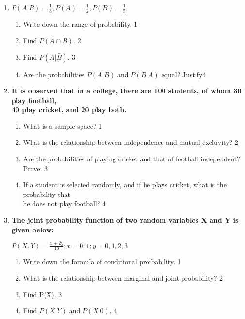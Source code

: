 \documentclass{article}
\begin{document}
\begin{enumerate}

  \item
  \textbf{$P(A\vert B) = \frac 1 8, P(A) = \frac 12, P(B) = \frac 15$}
 
  \begin{enumerate}
    \item
	Write down the range of probability. \hfill 1
    \item
    	Find $P(A\cap B)$.  \hfill 2
    \item
    	Find $P(A\vert \bar B)$. \hfill 3
     \item
     	Are the probabilities $P(A\vert B)$ and $P(B\vert A)$ equal? Justify\hfill 4
  \end{enumerate}
  
  \item
  \textbf{It is observed that in a college, there are 100 students, of whom 30 play football, \\ 40 play cricket, and 20 play both.}
 
  \begin{enumerate}
    \item
	What is a sample space? \hfill 1
    \item
    	What is the relationship between independence and mutual excluvity?  \hfill 2
    \item
    	Are the probabilities of playing cricket and that of football independent? Prove. \hfill 3
     \item
     	If a student is selected randomly, and if he plays cricket, what is the probability that \\ he does not play football? \hfill 4
  \end{enumerate}
  
    \item
  \textbf{The joint probability function of two random variables X and Y is given below:}
  
  $\displaystyle P(X,Y) = \frac {x+2y}{16}; x = 0, 1; y = 0 ,1,2,3$
 
  \begin{enumerate}
    \item
	Write down the formula of conditional proibability. \hfill 1
    \item
    	What is the relationship between marginal and joint probability? \hfill 2
    \item
    	Find P(X). \hfill 3
     \item
     	Find $P(X\vert Y)$ and $P(X\vert 0)$. \hfill 4
  \end{enumerate}


\end{enumerate}
\end{document}
